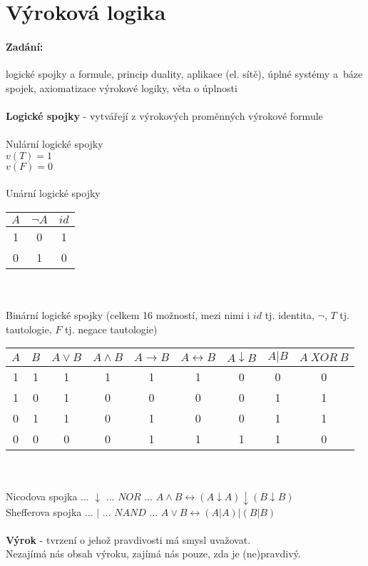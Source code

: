 \newpage

\section{Výroková logika}
% 
% 
% 
\paragraph*{Zadání:}
logické spojky a formule, princip duality, aplikace (el. sítě),
úplné systémy a~báze spojek, axiomatizace výrokové logiky, věta o úplnosti\\
~\\
\textbf{Logické spojky} - vytvářejí z výrokových proměnných výrokové formule\\~\\
Nulární logické spojky\\
$v(T) = 1$\\
$v(F) = 0$\\~\\
%
Unární logické spojky\\
\begin{tabular}{|c||c|c|}
\hline 
$A$ & $\neg A$ & $id$ \\ 
\hline 
1 & 0 & 1 \\ 
0 & 1 & 0 \\ 
\hline 
\end{tabular} ~\\~\\
%
Binární logické spojky (celkem 16 možností, mezi nimi i $id$ tj. identita, $\neg$, $T$ tj. tautologie, $F$ tj. negace tautologie)\\
\begin{tabular}{|c|c||c|c|c|c|c|c|c|}
\hline 
$A$ & $B$ & $A \vee B$ & $A \wedge B$ & $A \rightarrow B$ & $A \leftrightarrow B$ & $A\downarrow B$ & $A\vert B$ & $A~XOR~B$ \\ 
\hline 
1 & 1 & 1 & 1 & 1 & 1 & 0 & 0 & 0 \\ 
1 & 0 & 1 & 0 & 0 & 0 & 0 & 1 & 1 \\ 
0 & 1 & 1 & 0 & 1 & 0 & 0 & 1 & 1 \\ 
0 & 0 & 0 & 0 & 1 & 1 & 1 & 1 & 0 \\ 
\hline 
\end{tabular} ~\\~\\
Nicodova spojka ... $ \downarrow $ ... $NOR$ ... $A\wedge B \leftrightarrow (A\downarrow A)\downarrow (B\downarrow B)$\\
Shefferova spojka ... $ \vert $ ... $NAND$ ... $A\vee B \leftrightarrow (A\vert A)\vert (B\vert B)$\\~\\
%
\textbf{Výrok} - tvrzení o jehož pravdivosti má smysl uvažovat.\\
Nezajímá nás obsah výroku, zajímá nás pouze, zda je (ne)pravdivý.


